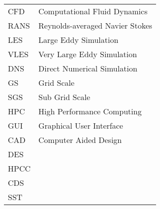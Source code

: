 \begin{table}[h]
\begin{tabular}{ll}
CFD&Computational Fluid Dynamics\\
RANS&Reynolds-averaged Navier Stokes\\
LES&Large Eddy Simulation\\
VLES&Very Large Eddy Simulation\\
DNS&Direct Numerical Simulation\\
GS&Grid Scale\\
SGS&Sub Grid Scale\\
HPC&High Performance Computing\\
GUI&Graphical User Interface\\
CAD&Computer Aided Design\\
DES&\\
HPCC&\\
CDS&\\
SST&\\
\end{tabular}
\end{table}